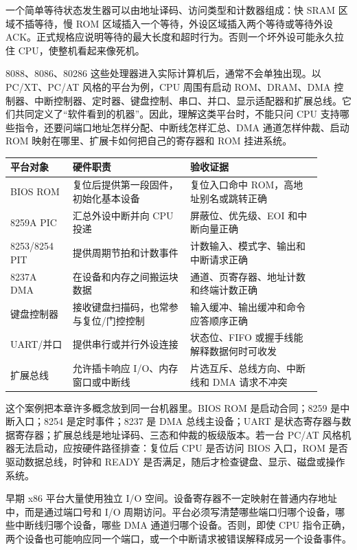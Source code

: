 一个简单等待状态发生器可以由地址译码、访问类型和计数器组成：快 SRAM 区域不插等待，慢 ROM 区域插入一个等待，外设区域插入两个等待或等待外设 ACK。正式规格应说明等待的最大长度和超时行为。否则一个坏外设可能永久拉住 CPU，使整机看起来像死机。

8088、8086、80286 这些处理器进入实际计算机后，通常不会单独出现。以 PC/XT、PC/AT 风格的平台为例，CPU 周围有启动 ROM、DRAM、DMA 控制器、中断控制器、定时器、键盘控制、串口、并口、显示适配器和扩展总线。它们共同定义了“软件看到的机器”。因此，理解这类平台时，不能只问 CPU 支持哪些指令，还要问端口地址怎样分配、中断线怎样汇总、DMA 通道怎样仲裁、启动 ROM 映射在哪里、扩展卡如何把自己的寄存器和 ROM 挂进系统。

\begin{longtable}{L{0.18\linewidth}L{0.34\linewidth}L{0.38\linewidth}}
\toprule
平台对象 & 硬件职责 & 验收证据 \\
\midrule
BIOS ROM & 复位后提供第一段固件，初始化基本设备 & 复位入口命中 ROM，高地址别名或跳转正确 \\
8259A PIC & 汇总外设中断并向 CPU 投递 & 屏蔽位、优先级、EOI 和中断向量正确 \\
8253/8254 PIT & 提供周期节拍和计数事件 & 计数输入、模式字、输出和中断请求正确 \\
8237A DMA & 在设备和内存之间搬运块数据 & 通道、页寄存器、地址计数和终端计数正确 \\
键盘控制器 & 接收键盘扫描码，也常参与复位/门控控制 & 输入缓冲、输出缓冲和命令应答顺序正确 \\
UART/并口 & 提供串行或并行外设连接 & 状态位、FIFO 或握手线能解释数据何时可收发 \\
扩展总线 & 允许插卡响应 I/O、内存窗口或中断线 & 片选互斥、总线方向、中断线和 DMA 请求不冲突 \\
\bottomrule
\end{longtable}

这个案例把本章许多概念放到同一台机器里。BIOS ROM 是启动合同；8259 是中断入口；8254 是定时事件；8237 是 DMA 总线主设备；UART 是状态寄存器与数据寄存器；扩展总线是地址译码、三态和仲裁的板级版本。若一台 PC/AT 风格机器无法启动，应按硬件路径排查：复位后 CPU 是否访问 BIOS 入口，ROM 是否驱动数据总线，时钟和 READY 是否满足，随后才检查键盘、显示、磁盘或操作系统。

早期 x86 平台大量使用独立 I/O 空间。设备寄存器不一定映射在普通内存地址中，而是通过端口号和 I/O 周期访问。平台必须写清楚哪些端口归哪个设备，哪些中断线归哪个设备，哪些 DMA 通道归哪个设备。否则，即使 CPU 指令正确，两个设备也可能响应同一个端口，或一个中断请求被错误解释成另一个设备事件。


